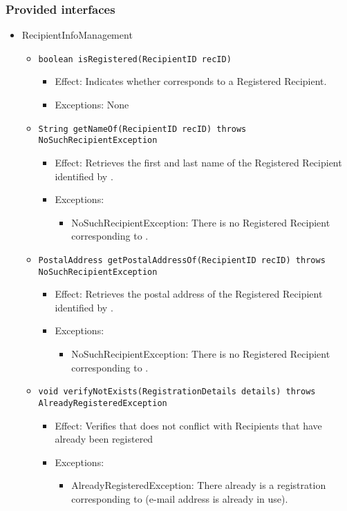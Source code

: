 \subsubsection*{Provided interfaces}
\begin{itemize}
    \item RecipientInfoManagement
    \begin{itemize}
        \item \texttt{boolean isRegistered(RecipientID recID)}
        \begin{itemize}
            \item Effect: Indicates whether  corresponds to a Registered Recipient.
            \item Exceptions: None
        \end{itemize}

		\item \texttt{String getNameOf(RecipientID recID) throws NoSuchRecipientException}
        \begin{itemize}
            \item Effect: Retrieves the first and last name of the Registered Recipient identified by .
            \item Exceptions:
			\begin{itemize}
				\item NoSuchRecipientException: There is no Registered Recipient corresponding to .
			\end{itemize}
        \end{itemize}

		\item \texttt{PostalAddress getPostalAddressOf(RecipientID recID) throws NoSuchRecipientException}
        \begin{itemize}
            \item Effect: Retrieves the postal address of the Registered Recipient identified by .
            \item Exceptions:
			\begin{itemize}
				\item NoSuchRecipientException: There is no Registered Recipient corresponding to .
			\end{itemize}
        \end{itemize}
		
        \item \texttt{void verifyNotExists(RegistrationDetails details) throws AlreadyRegisteredException}
        \begin{itemize}
            \item Effect: Verifies that  does not conflict with Recipients that have already been registered
            \item Exceptions:
			\begin{itemize}
				\item AlreadyRegisteredException: There already is a registration corresponding to  (e-mail address is already in use).
			\end{itemize}
        \end{itemize}


\end{itemize}
\end{itemize}
